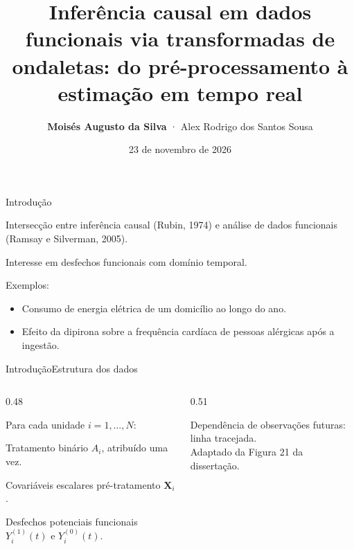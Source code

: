 \documentclass[aspectratio=169,t]{beamer}
\title{Inferência causal em dados funcionais via transformadas de ondaletas: do pré-processamento à estimação em tempo real}
\author{\textbf{Moisés Augusto da Silva} · Alex Rodrigo dos Santos Sousa}
\institute{Instituto de Matemática, Estatística e Computação Científica · UNICAMP}
\date{23 de novembro de 2026}
\begin{document}
\slideabertura
\begin{frame}{Introdução}
\begin{topicos}
\item Intersecção entre inferência causal {\tamLegenda (Rubin, 1974)} e análise de dados funcionais {\tamLegenda (Ramsay e Silverman, 2005)}.
\item Interesse em desfechos funcionais com domínio temporal.
\item Exemplos:
  \begin{itemize}
  \item Consumo de energia elétrica de um domicílio ao longo do ano.
  \item Efeito da dipirona sobre a frequência cardíaca de pessoas alérgicas após a ingestão.
  \end{itemize}
\end{topicos}
\end{frame}
\begin{frame}{Introdução}{Estrutura dos dados}
\begin{columns}[T,onlytextwidth]
\begin{column}{0.48\textwidth}
{\tamCorpo Para cada unidade $i=1,\ldots,N$:\par}
\begin{topicos}
\item Tratamento binário $A_i$, atribuído uma vez.
\item Covariáveis escalares pré-tratamento $\mathbf X_i$.
\item Desfechos potenciais funcionais $Y_i^{(1)}(t)$ e $Y_i^{(0)}(t)$.
\end{topicos}
\end{column}
\begin{column}{0.51\textwidth}
\centering
{}\par
{\tamLegenda Dependência de observações futuras: linha tracejada.\\Adaptado da Figura 21 da dissertação.\par}
\end{column}
\end{columns}
\end{frame}
\end{document}

